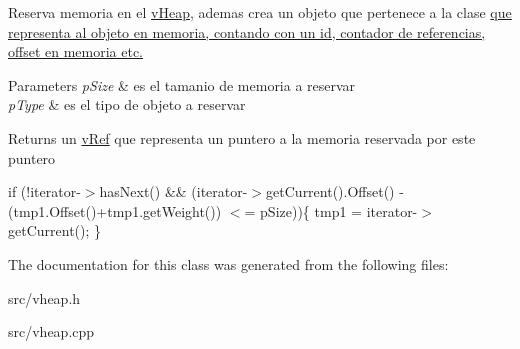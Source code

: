 Reserva memoria en el \hyperlink{classv_heap}{v\-Heap}, ademas crea un objeto que pertenece a la clase \hyperlink{class_minimalism_bit_vector}{que representa al objeto en memoria, contando con un id, contador de referencias, offset en memoria etc. }


\begin{DoxyParams}{Parameters}
{\em p\-Size} & es el tamanio de memoria a reservar \\
\hline
{\em p\-Type} & es el tipo de objeto a reservar \\
\hline
\end{DoxyParams}
\begin{DoxyReturn}{Returns}
un \hyperlink{classv_ref}{v\-Ref} que representa un puntero a la memoria reservada por este puntero 
\end{DoxyReturn}
if (!iterator-\/$>$has\-Next() \&\& (iterator-\/$>$get\-Current().Offset() -\/ (tmp1.\-Offset()+tmp1.get\-Weight()) $<$= p\-Size))\{ tmp1 = iterator-\/$>$get\-Current(); \}

The documentation for this class was generated from the following files\-:\begin{DoxyCompactItemize}
\item 
src/vheap.\-h\item 
src/vheap.\-cpp\end{DoxyCompactItemize}
